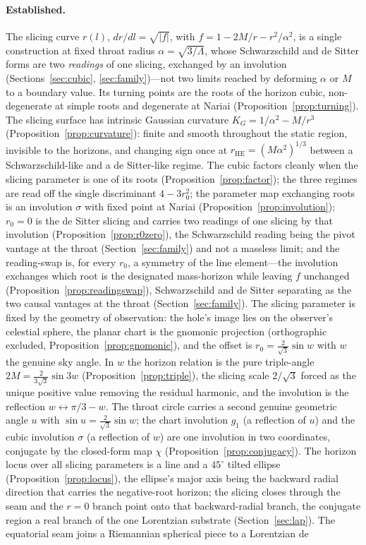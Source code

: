 \documentclass[11pt,a4paper]{article}
\theoremstyle{definition}
\begin{document}
\paragraph{Established.} The slicing curve $r(l)$, $dr/dl=\sqrt{|f|}$, with $f=1-2M/r-r^{2}/\alpha^{2}$, is a single construction at fixed throat radius $\alpha=\sqrt{3/\Lambda}$, whose Schwarzschild and de Sitter forms are two \emph{readings} of one slicing, exchanged by an involution (Sections~\ref{sec:cubic}, \ref{sec:family})---not two limits reached by deforming $\alpha$ or $M$ to a boundary value. Its turning points are the roots of the horizon cubic, non-degenerate at simple roots and degenerate at Nariai (Proposition~\ref{prop:turning}). The slicing surface has intrinsic Gaussian curvature $K_{G}=1/\alpha^{2}-M/r^{3}$ (Proposition~\ref{prop:curvature}): finite and smooth throughout the static region, invisible to the horizons, and changing sign once at $r_{\mathrm{HE}}=(M\alpha^{2})^{1/3}$ between a Schwarzschild-like and a de Sitter-like regime. The cubic factors cleanly when the slicing parameter is one of its roots (Proposition~\ref{prop:factor}); the three regimes are read off the single discriminant $4-3r_{0}^{2}$; the parameter map exchanging roots is an involution $\sigma$ with fixed point at Nariai (Proposition~\ref{prop:involution}); $r_{0}=0$ is the de Sitter slicing and carries two readings of one slicing by that involution (Proposition~\ref{prop:r0zero}), the Schwarzschild reading being the pivot vantage at the throat (Section~\ref{sec:family}) and not a massless limit; and the reading-swap is, for every $r_{0}$, a symmetry of the line element---the involution exchanges which root is the designated mass-horizon while leaving $f$ unchanged (Proposition~\ref{prop:readingswap}), Schwarzschild and de Sitter separating as the two causal vantages at the throat (Section~\ref{sec:family}). The slicing parameter is fixed by the geometry of observation: the hole's image lies on the observer's celestial sphere, the planar chart is the gnomonic projection (orthographic excluded, Proposition~\ref{prop:gnomonic}), and the offset is $r_{0}=\tfrac{2}{\sqrt3}\sin w$ with $w$ the genuine sky angle. In $w$ the horizon relation is the pure triple-angle $2M=\tfrac{2}{3\sqrt3}\sin 3w$ (Proposition~\ref{prop:triple}), the slicing scale $2/\sqrt3$ forced as the unique positive value removing the residual harmonic, and the involution is the reflection $w\leftrightarrow\pi/3-w$. The throat circle carries a second genuine geometric angle $u$ with $\sin u=\tfrac{2}{\sqrt3}\sin w$; the chart involution $g_{1}$ (a reflection of $u$) and the cubic involution $\sigma$ (a reflection of $w$) are one involution in two coordinates, conjugate by the closed-form map $\chi$ (Proposition~\ref{prop:conjugacy}). The horizon locus over all slicing parameters is a line and a $45^{\circ}$ tilted ellipse (Proposition~\ref{prop:locus}), the ellipse's major axis being the backward radial direction that carries the negative-root horizon; the slicing closes through the seam and the $r=0$ branch point onto that backward-radial branch, the conjugate region a real branch of the one Lorentzian substrate (Section~\ref{sec:lap}). The equatorial seam joins a Riemannian spherical piece to a Lorentzian de 
\end{document}
